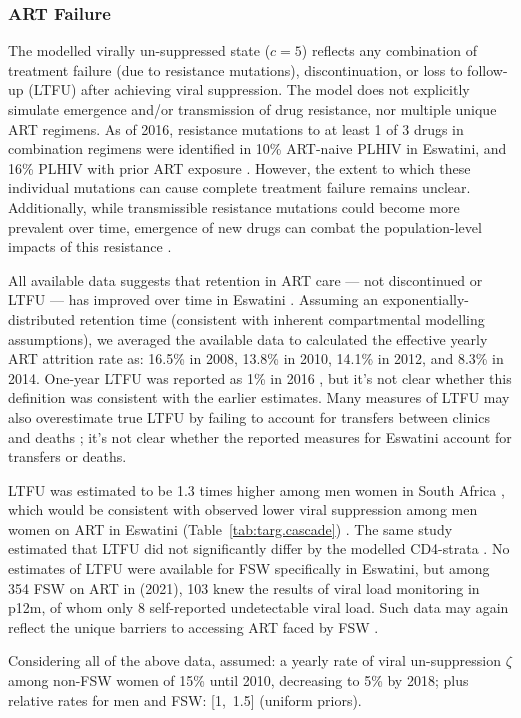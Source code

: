 \subsubsection{ART Failure}\label{mod.par.cascade.fail}
The modelled virally un-suppressed state ($c=5$) reflects any combination of
treatment failure (\ie due to resistance mutations),
discontinuation, or loss to follow-up (LTFU) after achieving viral suppression.
The model does not explicitly simulate emergence and/or transmission of drug resistance,
nor multiple unique ART regimens.
As of 2016, resistance mutations to at least 1 of 3 drugs in combination regimens
were identified in 10\% ART-naive PLHIV in Eswatini,
and 16\% PLHIV with prior ART exposure \cite{WHO2021dr}.
However, the extent to which these individual mutations can cause
complete treatment failure remains unclear. %
Additionally, while transmissible resistance mutations could become more prevalent over time,
emergence of new drugs can combat the population-level impacts of this resistance \cite{Hauser2019}.
\par
All available data suggests that retention in ART care
--- \ie not discontinued or LTFU ---
has improved over time in Eswatini \cite{NERCHA2014garp,NERCHA2018rep,SHIMS2}.
Assuming an exponentially-distributed retention time
(consistent with inherent compartmental modelling assumptions),
we averaged the available data \cite[Table~6]{NERCHA2018rep}
to calculated the effective yearly ART attrition rate as:
16.5\% in 2008, 13.8\% in 2010, 14.1\% in 2012, and 8.3\% in 2014.
One-year LTFU was reported as 1\% in 2016 \cite{SHIMS2},
but it's not clear whether this definition was consistent with the earlier estimates.
Many measures of LTFU may also overestimate true LTFU
by failing to account for transfers between clinics and deaths \cite{Fox2018,Wilkinson2015};
it's not clear whether the reported measures for Eswatini account for transfers or deaths.
\par
LTFU was estimated to be 1.3 times higher among men \vs women in South Africa \cite{Fox2018},
which would be consistent with observed lower viral suppression among men \vs women on ART
in Eswatini (Table~\ref{tab:targ.cascade}) \cite{Fox2018}.
The same study estimated that LTFU did not significantly differ
by the modelled CD4-strata \cite{Fox2018}.
No estimates of LTFU were available for FSW specifically in Eswatini,
but among 354 FSW on ART in \cite{EswIBBS2022} (2021),
103 knew the results of viral load monitoring in p12m,
of whom only 8 self-reported undetectable viral load.
Such data may again reflect the unique barriers to accessing ART faced by FSW \cite{Lancaster2016sr}.
\par
Considering all of the above data,  assumed:
a yearly rate of viral un-suppression $\zeta$ among non-FSW women of
15\% until 2010, decreasing to 5\% by 2018;
plus relative rates for men and FSW: [1,~1.5] (uniform priors).
